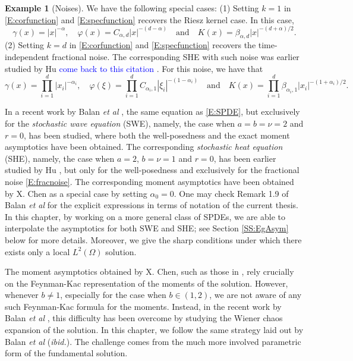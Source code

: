 \documentclass[12pt]{report}
\theoremstyle{plain}
\theoremstyle{definition}
\newtheorem{example}[theorem]{Example}
\numberwithin{equation}{section}
\begin{document}
\begin{example}[Noises] \label{Eg:NoiseEg}
	We have the following special cases: (1) Setting $k=1$ in \eqref{E:corfunction} and
	\eqref{E:specfunction} recovers the Riesz kernel case. In this case,
	\begin{equation}\label{E:riesznoise}
	\gamma(x)  = |x|^{-\alpha}, \quad
	\varphi(x) = C_{\alpha,d}|x|^{-(d-\alpha)} \quad \text{and} \quad
	K(x)       = \beta_{\alpha,d}|x|^{-(d+\alpha)/2}.
	\end{equation}
	\noindent (2) Setting $k=d$ in \eqref{E:corfunction} and \eqref{E:specfunction} recovers the
	time-independent fractional noise. The corresponding SHE with such noise was earlier studied by Hu \textcolor{blue}{come back to this citation}
	\cite{hu:01:heat}. For this noise, we have that
	\begin{equation}\label{E:fracnoise}
	\gamma(x)    = \prod_{i=1}^d |x_i|^{-\alpha_i}, \quad
	\varphi(\xi) = \prod_{i=1}^d C_{\alpha_i,1} |\xi_i|^{-(1-\alpha_i)}\quad\text{and}\quad
	K(x)         = \prod_{i=1}^d \beta_{\alpha_i,1}|x_i|^{-(1+\alpha_i)/2}.
	\end{equation}
\end{example}
\bigskip

In a recent work by Balan {\it et al} \cite{balan.chen.ea:22:exact}, the same equation as \eqref{E:SPDE}, but
exclusively for the {\it stochastic wave equation} (SWE), namely, the case when $a=b=\nu=2$ and
$r=0$, has been studied, where both the well-posedness and the exact moment asymptotics have been
obtained. The corresponding {\it stochastic heat equation} (SHE), namely, the case when $a=2$,
$b=\nu=1$ and $r=0$, has been earlier studied by Hu \cite{hu:01:heat}, but only for the well-posedness
and exclusively for the fractional noise \eqref{E:fracnoise}.  The corresponding moment asymptotics
have been obtained by X. Chen \cite{chen:17:moment} as a special case by setting $\alpha_0=0$. One may
check Remark 1.9 of Balan {\it et al} \cite{balan.chen.ea:22:exact} for the explicit expressions in terms of notation
of the current thesis. In this chapter, by working on a more general class of SPDEs, we are able to
interpolate the asymptotics for both SWE and SHE; see Section \ref{SS:EgAsym} below for more
details. Moreover, we give the sharp conditions under which there exists only a local $L^2(\Omega)$
solution.

The moment asymptotics obtained by X. Chen, such as those in \cite{chen:17:moment, chen:19:parabolic}, rely
crucially on the Feynman-Kac representation of the moments of the solution. However, whenever $b\ne
1$, especially for the case when $b\in(1,2)$, we are not aware of any such Feynman-Kac formula for
the moments. Instead, in the recent work by Balan {\it et al} \cite{balan.chen.ea:22:exact}, this difficulty has been
overcome by studying the Wiener chaos expansion of the solution. In this chapter, we follow the same
strategy laid out by Balan {\it et al} ({\it ibid.}). The challenge comes from the much more
involved parametric form of the fundamental solution.  \bigskip
\end{document}
